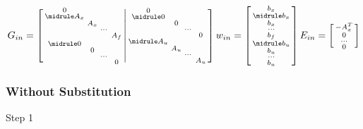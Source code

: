\[
	G_{in} =
	\left[
		\begin{smallmatrix}
			0 & & & \\
			\midrule
			A_x & & & \\
			& A_x & & \\
			& & \cdots & \\
			& & & A_f \\
			\midrule
			0 & & & \\
			& 0 & & \\
			& & \cdots & \\
			& & & 0
		\end{smallmatrix}
		\middle|
		\begin{smallmatrix}
			0 & & & \\
			\midrule
			0 & & & \\
			& 0 & & \\
			& & \cdots & \\
			& & & 0 \\
			\midrule
			A_u & & & \\
			& A_u & & \\
			& & \cdots & \\
			& & & A_u
		\end{smallmatrix}
		\right]
	w_{in} =
	\left[
		\begin{smallmatrix}
			b_x \\
			\midrule
			b_x \\
			b_x \\
			\cdots \\
			b_f \\
			\midrule
			b_u \\
			b_u \\
			\cdots \\
			b_u \\
		\end{smallmatrix}
		\right]
	E_{in} =
	\left[
		\begin{smallmatrix}
			-A_x^T \\%
			0 \\
			\cdots \\
			0 \\
		\end{smallmatrix}
		\right]
\]



\subsubsection{Without Substitution}

Step 1

